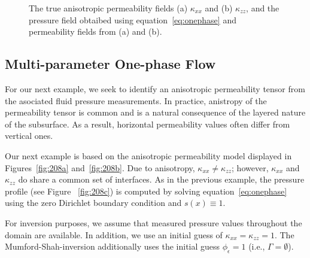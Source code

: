 \documentclass[manuscript,revised]{geophysics}
\begin{document}
{\begin{figure}
\caption{The true anisotropic permeability fields (a) $\kappa_{xx}$ and (b) $\kappa_{zz}$, and the pressure field obtaibed using equation~\ref{eq:onephase} and permeability fields from (a) and (b).}
\label{fig:208}
\end{figure}
}

\subsection{Multi-parameter One-phase Flow}
For our next example, we seek to identify an anisotropic permeability tensor from the asociated fluid pressure measurements.  In practice, anistropy of the permeability tensor is common and is a natural consequence of the layered nature of the subsurface.  As a result, horizontal permeability values often differ from vertical ones.

Our next example is based on the anisotropic permeability model displayed in Figures~\ref{fig:208a} and~\ref{fig:208b}.  Due to anisotropy, $\kappa_{xx} \neq \kappa_{zz}$; however, $\kappa_{xx}$ and $\kappa_{zz}$ do share a common set of interfaces.  As in the previous example, the pressure profile (see Figure ~\ref{fig:208c}) is  computed by solving equation~\ref{eq:onephase} using the zero Dirichlet boundary condition and $s(x) \equiv 1$.  

For inversion purposes, we assume that measured pressure values throughout the domain are available.  In addition, we use an initial guess of $\kappa_{xx}=\kappa_{zz}=1$.  The Mumford-Shah-inversion additionally uses the initial guess $\phi_\epsilon=1$ (i.e., $\Gamma=\emptyset$).
\end{document}
